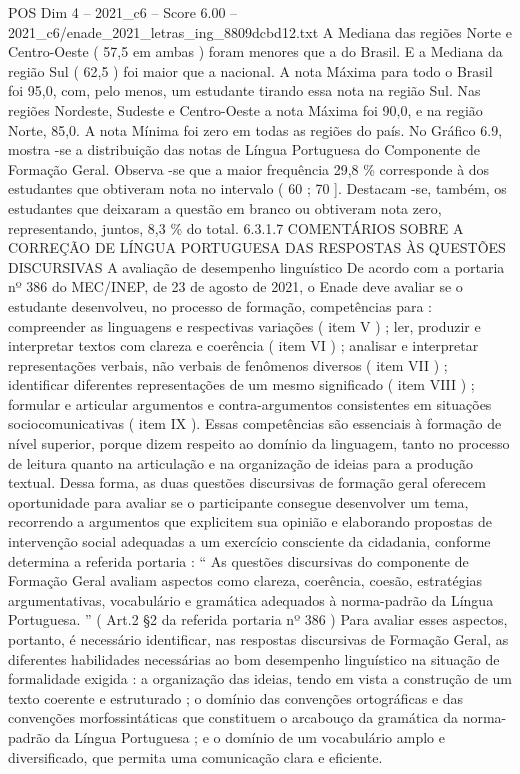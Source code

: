 \begin{textsample}{POS Dim 4 – 2021\_c6 – Score 6.00 – 2021\_c6/enade\_2021\_letras\_ing\_8809dcbd12.txt}
A Mediana das regiões Norte e Centro-Oeste ( 57,5 em ambas ) foram menores que a do Brasil.
E a Mediana da região Sul ( 62,5 ) foi maior que a nacional.
A nota Máxima para todo o Brasil foi 95,0, com, pelo menos, um estudante tirando essa nota na região Sul.
Nas regiões Nordeste, Sudeste e Centro-Oeste a nota Máxima foi 90,0, e na região Norte, 85,0.
A nota Mínima foi zero em todas as regiões do país.
No Gráfico 6.9, mostra -se a distribuição das notas de Língua Portuguesa do Componente de Formação Geral.
Observa -se que a maior frequência 29,8 \% corresponde à dos estudantes que obtiveram nota no intervalo ( 60 ; 70 ].
Destacam -se, também, os estudantes que deixaram a questão em branco ou obtiveram nota zero, representando, juntos, 8,3 \% do total. 6.3.1.7 COMENTÁRIOS SOBRE A CORREÇÃO DE LÍNGUA PORTUGUESA DAS RESPOSTAS ÀS QUESTÕES DISCURSIVAS A avaliação de desempenho linguístico De acordo com a portaria nº 386 do MEC/INEP, de 23 de agosto de 2021, o Enade deve avaliar se o estudante desenvolveu, no processo de formação, competências para : compreender as linguagens e respectivas variações ( item V ) ; ler, produzir e interpretar textos com clareza e coerência ( item VI ) ; analisar e interpretar representações verbais, não verbais de fenômenos diversos ( item VII ) ; identificar diferentes representações de um mesmo significado ( item VIII ) ; formular e articular argumentos e contra-argumentos consistentes em situações sociocomunicativas ( item IX ).
Essas competências são essenciais à formação de nível superior, porque dizem respeito ao domínio da linguagem, tanto no processo de leitura quanto na articulação e na organização de ideias para a produção textual.
Dessa forma, as duas questões discursivas de formação geral oferecem oportunidade para avaliar se o participante consegue desenvolver um tema, recorrendo a argumentos que explicitem sua opinião e elaborando propostas de intervenção social adequadas a um exercício consciente da cidadania, conforme determina a referida portaria : “ As questões discursivas do componente de Formação Geral avaliam aspectos como clareza, coerência, coesão, estratégias argumentativas, vocabulário e gramática adequados à norma-padrão da Língua Portuguesa. ” ( Art.2 §2 da referida portaria nº 386 ) Para avaliar esses aspectos, portanto, é necessário identificar, nas respostas discursivas de Formação Geral, as diferentes habilidades necessárias ao bom desempenho linguístico na situação de formalidade exigida : a organização das ideias, tendo em vista a construção de um texto coerente e estruturado ; o domínio das convenções ortográficas e das convenções morfossintáticas que constituem o arcabouço da gramática da norma-padrão da Língua Portuguesa ; e o domínio de um vocabulário amplo e diversificado, que permita uma comunicação clara e eficiente.

\end{textsample}
